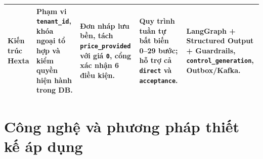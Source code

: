 \begin{table}[htbp]
\begin{tabularx}{\linewidth}{@{}
    >{\raggedright\arraybackslash}p{2.65cm}
    >{\raggedright\arraybackslash}X
    >{\raggedright\arraybackslash}X
    >{\raggedright\arraybackslash}X
    >{\raggedright\arraybackslash}X@{}}
    \textbf{Kiến trúc Hexta} &
    \textbf{Phạm vi \texttt{tenant\_\hspace{0pt}id}, khóa ngoại tổ hợp và kiểm quyền hiện hành trong DB.} &
    \textbf{Đơn nháp lưu bền, tách \texttt{price\_\hspace{0pt}provided} với giá \texttt{0}, cổng xác nhận 6 điều kiện.} &
    \textbf{Quy trình tuần tự bất biến 0--29 bước; hỗ trợ cả \texttt{direct} và \texttt{acceptance}.} &
    \textbf{LangGraph + Structured Output + Guardrails, \texttt{control\_\hspace{0pt}generation}, Outbox/\hspace{0pt}Kafka.} \\
    \bottomrule
  \end{tabularx}
\end{table}

\section{Công nghệ và phương pháp thiết kế áp dụng}

